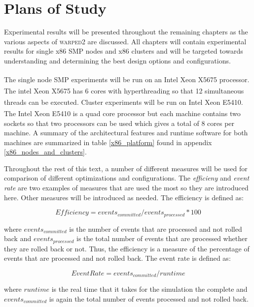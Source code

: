 \documentclass[11pt]{book}
\begin{document}
\chapter{Plans of Study}\label{plans_of_study}

Experimental results will be presented throughout the remaining chapters as the various aspects
of \textsc{warped2} are discussed.  All chapters will contain experimental results for single
x86 SMP nodes and x86 clusters and will be targeted towards understanding and determining the best
design options and configurations.

The single node SMP experiments will be run on an Intel\textsuperscript{\textregistered}
Xeon\textsuperscript{\textregistered} X5675 processor.  The intel\textsuperscript{\textregistered} Xeon
\textsuperscript{\textregistered} X5675 has 6 cores with hyperthreading so that 12 simultaneous
threads can be executed.  Cluster experiments will be run on Intel\textsuperscript{\textregistered}
Xeon\textsuperscript{\textregistered} E5410.  The Intel\textsuperscript{\textregistered}
Xeon\textsuperscript{\textregistered} E5410 is a quad core processor but each machine contains
two sockets so that two processors can be used which gives a total of 8 cores per machine.
A summary of the architectural features and runtime software for both machines are summarized
in table \ref{x86_platform} found in appendix \ref{x86_nodes_and_clusters}.

Throughout the rest of this text, a number of different measures will be used for comparison
of different optimizations and configurations.  The \emph{efficieny} and \emph{event rate} are
two examples of measures that are used the most so they are introduced here.  Other measures
will be introduced as needed.  The efficiency is defined as:

$$ Efficiency = {events_{committed}}/{events_{processed}} * 100 $$

\noindent
where $events_{committed}$ is the number of events that are processed and not rolled back and
$events_{processed}$ is the total number of events that are processed whether they are rolled
back or not.  Thus, the efficiency is a measure of the percentage of events that are processed
and not rolled back.  The event rate is defined as:

$$ Event Rate = {events_{committed}}/{runtime} $$

\noindent
where $runtime$ is the real time that it takes for the simulation the complete and $events_{committed}$
is again the total number of events processed and not rolled back.
\end{document}
